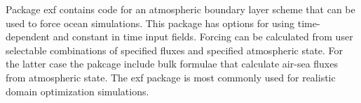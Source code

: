 
Package exf contains code for an atmospheric boundary layer
scheme that can be used to force ocean simulations. This package
has options for using time-dependent and constant in time input fields.
Forcing can be calculated from user selectable combinations of 
specified fluxes and specified atmospheric state. For the latter
case the pakcage include bulk formulae that calculate air-sea
fluxes from atmospheric state. The exf package is most commonly
used for realistic domain optimization simulations.


